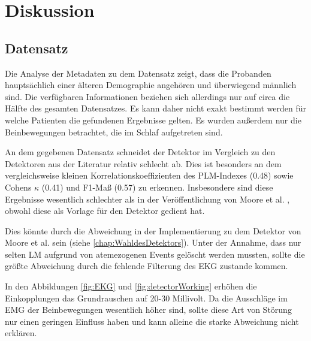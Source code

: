\chapter{Diskussion}\label{chap:Diskussion}
\section{Datensatz}

Die Analyse der Metadaten zu dem Datensatz zeigt, dass die Probanden hauptsächlich einer älteren Demographie angehören und überwiegend männlich sind. Die verfügbaren Informationen beziehen sich allerdings nur auf circa die Hälfte des gesamten Datensatzes. Es kann daher nicht exakt bestimmt werden für welche Patienten die gefundenen Ergebnisse gelten. Es wurden außerdem nur die Beinbewegungen betrachtet, die im Schlaf aufgetreten sind.

An dem gegebenen Datensatz schneidet der Detektor im Vergleich zu den Detektoren aus der Literatur relativ schlecht ab. Dies ist besonders an dem vergleichsweise kleinen Korrelationskoeffizienten des PLM-Indexes (0.48) sowie Cohens $\kappa$ (0.41) und F1-Maß (0.57) zu erkennen. Insbesondere sind diese Ergebnisse wesentlich schlechter als in der Veröffentlichung von Moore et al. \cite{Moore}, obwohl diese als Vorlage für den Detektor gedient hat.

Dies könnte durch die Abweichung in der Implementierung zu dem Detektor von Moore et al. sein (siehe \ref{chap:WahldesDetektors}). Unter der Annahme, dass nur selten LM aufgrund von atemezogenen Events gelöscht werden mussten, sollte die größte Abweichung durch die fehlende Filterung des EKG zustande kommen.

In den Abbildungen \ref{fig:EKG} und \ref{fig:detectorWorking} erhöhen die Einkopplungen das Grundrauschen auf 20-30 Millivolt. Da die Ausschläge im EMG der Beinbewegungen wesentlich höher sind, sollte diese Art von Störung nur einen geringen Einfluss haben und kann alleine die starke Abweichung nicht erklären.



